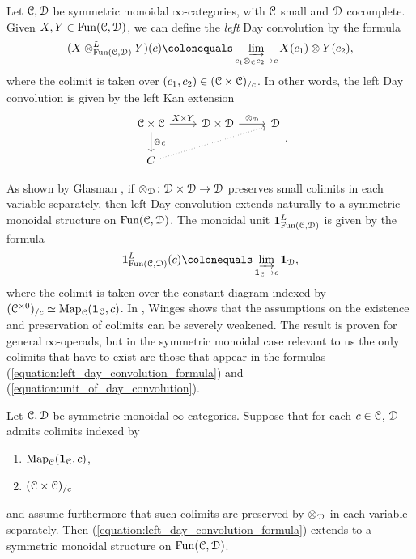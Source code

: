 \documentclass[oneside,a4paper]{amsart}
\begin{document}
\begin{recollection}
Let $\EuScript{C}, \EuScript{D}$ be symmetric monoidal $\infty$-categories, with $\EuScript{C}$ small and $\EuScript{D}$ cocomplete. Given $X, Y \in \mathrm{Fun}(\EuScript{C}, \EuScript{D})$, we can define the \emph{left} Day convolution by the formula 
\begin{equation}
\label{equation:left_day_convolution_formula}
(X \otimes_{\Fun(\ccat, \dcat)}^{L} Y)(c) \colonequals \varinjlim _{c_{1} \otimes_{\ccat} c_{2} \rightarrow c} X(c_{1}) \otimes Y(c_{2}),
\end{equation}
where the colimit is taken over $(c_{1}, c_{2}) \in (\EuScript{C} \times \EuScript{C})_{/c}$. In other words, the left Day convolution is given by the left Kan extension 
\[
\begin{tikzcd}
	{\ccat \times \ccat} & {\dcat \times \dcat} & \dcat \\
	C & {}
	\arrow["{X \times Y}", from=1-1, to=1-2]
	\arrow["{\otimes_{\ccat}}", from=1-1, to=2-1]
	\arrow["{\otimes_{\dcat}}", from=1-2, to=1-3]
	\arrow[dotted, from=2-1, to=1-3]
\end{tikzcd}.
\]
\end{recollection}
As shown by Glasman \cite{glasman2017day}, if $\otimes_{\EuScript{D}} \colon \EuScript{D} \times \EuScript{D} \rightarrow \EuScript{D}$ preserves small colimits in each variable separately, then left Day convolution extends naturally to a symmetric monoidal structure on $\mathrm{Fun}(\EuScript{C}, \EuScript{D})$. The monoidal unit $\mathbf{1}_{\mathrm{Fun}(\EuScript{C}, \EuScript{D})}^{L}$ is given by the formula 
\begin{equation}
\label{equation:unit_of_day_convolution}
\mathbf{1}_{\Fun(\ccat, \dcat)}^{L}(c) \colonequals \varinjlim_{\mathbf{1}_{\ccat} \rightarrow c} \mathbf{1}_{\dcat}, 
\end{equation}
where the colimit is taken over the constant diagram indexed by $(\EuScript{C}^{\times 0})_{/c} \simeq \mathrm{Map}_{\EuScript{C}}(\mathbf{1}_{\EuScript{C}}, c)$. In \cite{winges2026hinich}, Winges shows that the assumptions on the existence and preservation of colimits can be severely weakened. The result is proven for general $\infty$-operads, but in the symmetric monoidal case relevant to us the only colimits that have to exist are those that appear in the formulas (\ref{equation:left_day_convolution_formula}) and (\ref{equation:unit_of_day_convolution}). 

\begin{theorem}[Winges]
\label{theorem:existence_of_left_day_convolution}
Let $\EuScript{C}, \EuScript{D}$ be symmetric monoidal $\infty$-categories. Suppose that for each $c \in \EuScript{C}$, $\EuScript{D}$ admits colimits indexed by
\begin{enumerate}
\item $\mathrm{Map}_{\EuScript{C}}(\mathbf{1}_{\EuScript{C}}, c)$, 
\item $(\EuScript{C} \times \EuScript{C})_{/c}$
\end{enumerate}
and assume furthermore that such colimits are preserved by $\otimes_{\EuScript{D}}$ in each variable separately. Then (\ref{equation:left_day_convolution_formula}) extends to a symmetric monoidal structure on $\mathrm{Fun}(\EuScript{C}, \EuScript{D})$. 
\end{theorem}
\end{document}
